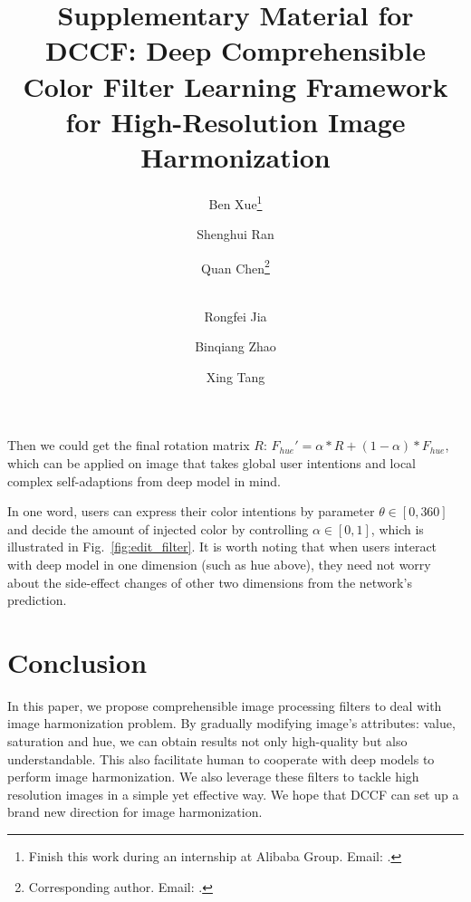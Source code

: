 \documentclass[runningheads]{llncs}
\begin{document}
    Then we could get the final rotation matrix $R$: $F_{hue}'=\alpha * R + (1-\alpha) * F_{hue}$, which can be applied on image that takes global user intentions and local complex self-adaptions from deep model in mind.
    
    In one word, users can express their color intentions by parameter $\theta \in [0,360]$ and decide the amount of injected color by controlling $\alpha \in [0,1]$, which is illustrated in Fig.~\ref{fig:edit_filter}.
    It is worth noting that when users interact with deep model in one dimension (such as hue above), they need not worry about the side-effect changes of other two dimensions from the network's prediction.
    
    
    







    \section{Conclusion}
    
    In this paper, we propose comprehensible image processing filters to deal with image harmonization problem. 
    By gradually modifying image's attributes: value, saturation and hue, we can obtain results not only high-quality but also understandable. 
    This also facilitate human to cooperate with deep models to perform image harmonization.
    We also leverage these filters to tackle high resolution images in a simple yet effective way. 
    We hope that DCCF can set up a brand new direction for image harmonization.
    

\clearpage





\title{Supplementary Material for DCCF: Deep Comprehensible Color Filter Learning Framework for High-Resolution Image Harmonization} 
\author{Ben Xue\thanks{Finish this work during an internship at Alibaba Group. Email: .}\and
Shenghui Ran \and
Quan Chen\thanks{Corresponding author. Email: . }\and \\
Rongfei Jia\and
Binqiang Zhao\and
Xing Tang\\
}


\end{document}
